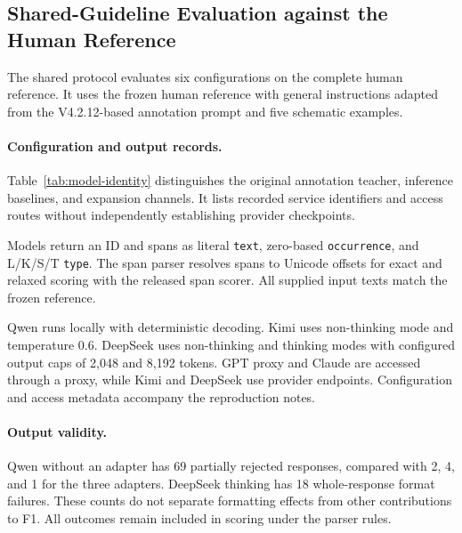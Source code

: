 \subsection{Shared-Guideline Evaluation against the Human Reference}
\label{sec:gold150-shared-r7}
The shared protocol evaluates six configurations on the complete human reference. It uses the frozen human reference with general instructions adapted from the V4.2.12-based annotation prompt and five schematic examples.

\paragraph{Configuration and output records.}
Table~\ref{tab:model-identity} distinguishes the original annotation teacher, inference baselines, and expansion channels. It lists recorded service identifiers and access routes without independently establishing provider checkpoints.



Models return an ID and spans as literal \texttt{text}, zero-based \texttt{occurrence}, and L/K/S/T \texttt{type}. The span parser resolves spans to Unicode offsets for exact and relaxed scoring with the released span scorer. All supplied input texts match the frozen reference.

Qwen runs locally with deterministic decoding. Kimi uses non-thinking mode and temperature 0.6. DeepSeek uses non-thinking and thinking modes with configured output caps of 2,048 and 8,192 tokens. GPT proxy and Claude are accessed through a proxy, while Kimi and DeepSeek use provider endpoints. Configuration and access metadata accompany the reproduction notes.


\FloatBarrier





\paragraph{Output validity.}
Qwen without an adapter has 69 partially rejected responses, compared with 2, 4, and 1 for the three adapters. DeepSeek thinking has 18 whole-response format failures. These counts do not separate formatting effects from other contributions to F1. All outcomes remain included in scoring under the parser rules.

